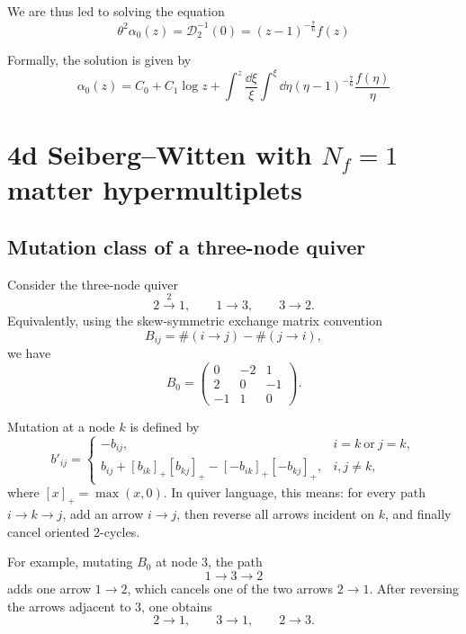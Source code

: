 \documentclass[11pt, a4paper]{article}
\numberwithin{equation}{section}
\begin{document}
We are thus led to solving the equation
\begin{equation}
  \theta^2 \alpha_0(z) = \mathcal{D}_2^{-1}(0) = (z-1)^{-\tfrac76} f(z)
\end{equation}

Formally, the solution is given by
\begin{equation}
  \alpha_0(z) = C_0 + C_1 \log z + \int^z \frac{\dd{\xi}}{\xi} \int^{\xi} \dd{\eta} (\eta-1)^{-\tfrac76} \frac{f(\eta)}{\eta}
\end{equation}



\section{4d Seiberg--Witten with \texorpdfstring{$N_f = 1$}{Nf=1} matter hypermultiplets}

\subsection{Mutation class of a three-node quiver}

Consider the three-node quiver
\[
2 \xrightarrow{2} 1,\qquad 1\to 3,\qquad 3\to 2 .
\]
Equivalently, using the skew-symmetric exchange matrix convention
\[
B_{ij}=\#(i\to j)-\#(j\to i),
\]
we have
\[
B_0=
\begin{pmatrix}
0&-2&1\\
2&0&-1\\
-1&1&0
\end{pmatrix}.
\]

Mutation at a node \(k\) is defined by
\[
b'_{ij}=
\begin{cases}
-b_{ij}, & i=k\ \text{or}\ j=k,\\[4pt]
b_{ij}+[b_{ik}]_+[b_{kj}]_+
      -[-b_{ik}]_+[-b_{kj}]_+, & i,j\neq k,
\end{cases}
\]
where \([x]_+=\max(x,0)\). In quiver language, this means: for every path
\(i\to k\to j\), add an arrow \(i\to j\), then reverse all arrows incident
on \(k\), and finally cancel oriented 2-cycles.

For example, mutating \(B_0\) at node \(3\), the path
\[
1\to 3\to 2
\]
adds one arrow \(1\to 2\), which cancels one of the two arrows \(2\to 1\).
After reversing the arrows adjacent to \(3\), one obtains
\[
2\to1,\qquad 3\to1,\qquad 2\to3.
\]
\end{document}

